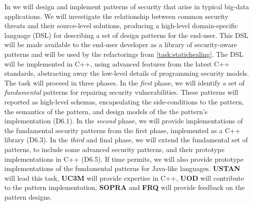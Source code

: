 \begin{Workpackage}{\thewpno}
\begin{Task}
%
%
\end{Task}

\begin{Task}
	\TaskResults{%
	}
	\TaskHeader{}
	
In \theTask{} we will design and implement patterns of security that arise in typical big-data applications. We will investigate the relationship between common security threats and their source-level solutions, producing a high-level domain-specific language (DSL) for describing a set of design patterns for the end-user. This DSL will be made available to the end-user developer as a library of security-aware patterns and will be used by the refactorings from \ref{task:statichealing}. The DSL will be implemented in C++, using advanced features from the latest C++ standards, abstracting away the low-level details of programming security models.
%
The task will proceed in three phases. In the \emph{first} phase, we will identify a set of \emph{fundamental} patterns for repairing security vulnerabilities. These patterns will reported as high-level schemas, encapsulating the side-conditions to the pattern, the semantics of the pattern, and design models of the the pattern's implementation (D6.1).
In the \emph{second} phase, we will provide implementations of the fundamental security patterns from the first phase, implemented as a C++ library (D6.3). In the \emph{third} and final phase, we will extend the fundamental set of patterns, to include some advanced security patterns, and their prototype implementations in C++ (D6.5). If time permits, we will also provide prototype implementations of the fundamental patterns for Java-like languages. \textbf{USTAN} will lead this task, \textbf{UC3M} will provide expertise in C++, \textbf{UOD} will contribute to the pattern implementation, \textbf{SOPRA} and \textbf{FRQ} will provide feedback on the pattern designs.
\end{Task}


\end{Workpackage}

